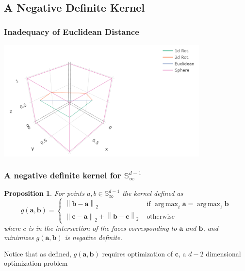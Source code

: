 \documentclass[aspectratio=169]{beamer}
\newcommand{\norm}[1]{\left\lVert #1 \right\rVert}
\newcommand{\pnorm}[2]{\norm{#1}_{#2}}
\newtheorem{prop}{Proposition}
\DeclareMathOperator*{\argmax}{arg\,max}
\begin{document}
\subsection{A Negative Definite Kernel}
\begin{frame}
  \frametitle{Inadequacy of Euclidean Distance}
  \begin{center}
    \includegraphics[width = 0.8\textwidth]{./images/rotation}
  \end{center}
  \pause
\end{frame}

\begin{frame}
  \frametitle{A negative definite kernel for ${\mathbb S}_{\infty}^{d-1}$}
  \begin{prop}
    For points $a,b \in {\mathbb S}_{\infty}^{d-1}$ the kernel defined as
    \[
      g(\bm{a},\bm{b}) = \begin{cases}
        \pnorm{\bm{b}-\bm{a}}{2} &\text{ if }\argmax_{\ell}\bm{a} =
        \argmax_{\ell}\bm{b}\\
        \pnorm{\bm{c}-\bm{a}}{2} + \pnorm{\bm{b}-\bm{c}}{2} &\text{ otherwise}
      \end{cases}
    \]
    where $c$ is in the intersection of the faces corresponding to $\bm{a}$
    and $\bm{b}$, and minimizes $g(\bm{a},\bm{b})$ is negative definite.
  \end{prop}
  Notice that as defined, $g(\bm{a},\bm{b})$ requires optimization of $\bm{c}$,
    a $d-2$ dimensional optimization problem
\end{frame}
\end{document}
